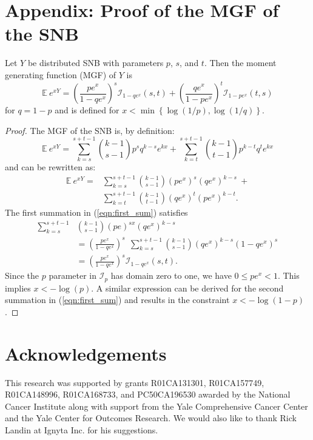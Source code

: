 \documentclass[sii]{ipart}
\begin{document}
\section{Appendix: Proof of the MGF of the SNB}
Let $Y$ be distributed SNB with parameters $p$, $s$, and $t$.
Then the moment generating function (MGF) of $Y$ is
\begin{equation} 
\mathbb{E}~e^{xY} = \left(\frac{p e^x}{1 - qe^x}\right)^s 
  \mathcal{I}_{1-qe^x} (s, t) + \left(\frac{qe^x}{1-pe^x}\right)^t 
  \mathcal{I}_{1-pe^x}(t, s)
\end{equation}
for $q = 1-p$ and is defined for 
$x < \min \left\{\log(1/p), \log(1/q) \right\}$.
\begin{proof}
The MGF of the SNB is, by definition:
\begin{equation*}
\mathbb{E}~e^{xY} = \sum_{k=s}^{s+t-1} {k-1 \choose s-1} p^s q^{k-s} e^{kx} 
  + \sum_{k=t}^{s+t-1} {k-1 \choose t-1} p^{k-t} q^t e^{kx}
\end{equation*}
and can be rewritten as:
\begin{align} \label{eqn:first_sum}
\mathbb{E}~e^{xY} =& 
  \sum_{k=s}^{s+t-1}{k-1 \choose s-1} (pe^x)^{s} (qe^x)^{k-s} \ + \nonumber \\
  & \sum_{k=t}^{s+t-1}{k-1 \choose t-1} (qe^x)^t (pe^x)^{k-t}.
\end{align}
The first summation in (\ref{eqn:first_sum}) satisfies
\begin{align*}
\sum_{k=s}^{s+t-1} & {k-1 \choose s-1} (pe)^{sx} (qe^x)^{k-s} \\ 
  &= \left(\frac{pe^x}{1 - qe^x}\right)^s \ \ \sum_{k=s}^{s+t-1} {k-1 \choose s-1} 
    (qe^x)^{k-s} (1-qe^x)^s \\
  &= \left(\frac{pe^x}{1 - qe^x}\right)^s \mathcal{I}_{1-qe^x}(s, t).
\end{align*}
Since the $p$ parameter in $\mathcal{I}_p$ has domain zero 
to one, we have $0 \leq pe^x < 1$. This implies $x < -\log(p)$.
A similar expression can be derived for the second summation in 
(\ref{eqn:first_sum}) and results in
the constraint $x < -\log(1-p)$.
\end{proof}

\section*{Acknowledgements}
This research was supported by grants R01CA131301, 
R01CA157749, R01CA148996, R01CA168733, and PC50CA196530 awarded by the 
National Cancer Institute along with support from the Yale Comprehensive Cancer 
Center and the Yale Center for Outcomes Research. We would also like 
to thank Rick Landin at Ignyta Inc. for his suggestions.



\end{document}
